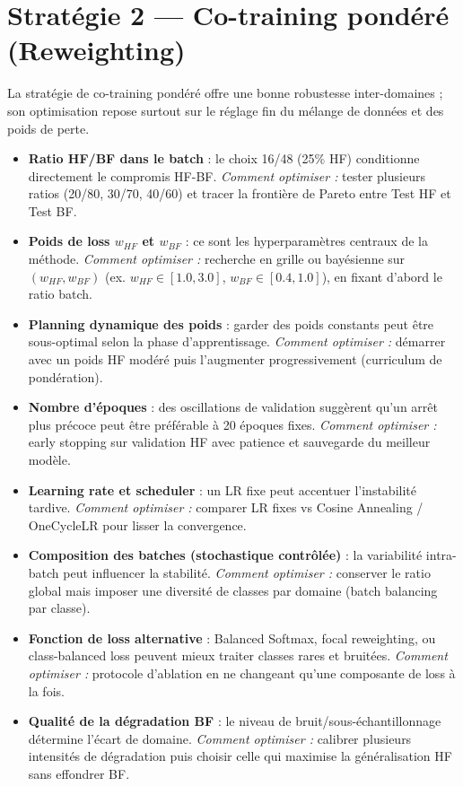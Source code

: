 \documentclass[11pt,a4paper,openany]{book}
\begin{document}
\section{Stratégie 2 — Co-training pondéré (Reweighting)}

La stratégie de co-training pondéré offre une bonne robustesse inter-domaines ; son optimisation repose surtout sur le réglage fin du mélange de données et des poids de perte.

\begin{itemize}
  \item \textbf{Ratio HF/BF dans le batch} : le choix 16/48 (25\% HF) conditionne directement le compromis HF-BF. \textit{Comment optimiser :} tester plusieurs ratios (20/80, 30/70, 40/60) et tracer la frontière de Pareto entre Test HF et Test BF.
  \item \textbf{Poids de loss $w_{HF}$ et $w_{BF}$} : ce sont les hyperparamètres centraux de la méthode. \textit{Comment optimiser :} recherche en grille ou bayésienne sur $(w_{HF}, w_{BF})$ (ex. $w_{HF}\in[1.0,3.0]$, $w_{BF}\in[0.4,1.0]$), en fixant d'abord le ratio batch.
  \item \textbf{Planning dynamique des poids} : garder des poids constants peut être sous-optimal selon la phase d'apprentissage. \textit{Comment optimiser :} démarrer avec un poids HF modéré puis l'augmenter progressivement (curriculum de pondération).
  \item \textbf{Nombre d'époques} : des oscillations de validation suggèrent qu'un arrêt plus précoce peut être préférable à 20 époques fixes. \textit{Comment optimiser :} early stopping sur validation HF avec patience et sauvegarde du meilleur modèle.
  \item \textbf{Learning rate et scheduler} : un LR fixe peut accentuer l'instabilité tardive. \textit{Comment optimiser :} comparer LR fixes vs Cosine Annealing / OneCycleLR pour lisser la convergence.
  \item \textbf{Composition des batches (stochastique contrôlée)} : la variabilité intra-batch peut influencer la stabilité. \textit{Comment optimiser :} conserver le ratio global mais imposer une diversité de classes par domaine (batch balancing par classe).
  \item \textbf{Fonction de loss alternative} : Balanced Softmax, focal reweighting, ou class-balanced loss peuvent mieux traiter classes rares et bruitées. \textit{Comment optimiser :} protocole d'ablation en ne changeant qu'une composante de loss à la fois.
  \item \textbf{Qualité de la dégradation BF} : le niveau de bruit/sous-échantillonnage détermine l'écart de domaine. \textit{Comment optimiser :} calibrer plusieurs intensités de dégradation puis choisir celle qui maximise la généralisation HF sans effondrer BF.

\end{itemize}
\end{document}
